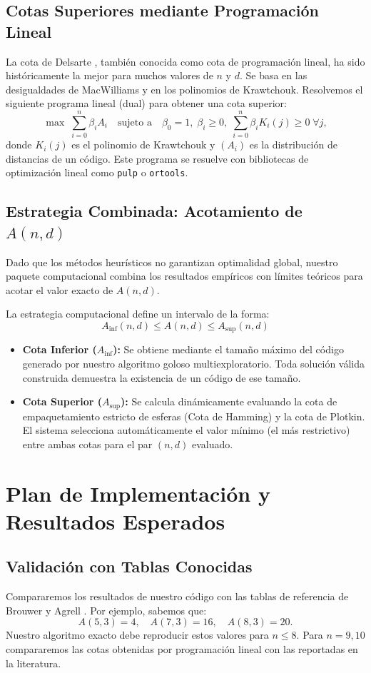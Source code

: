 \documentclass[12pt, spanish]{article}
\begin{document}
\subsection{Cotas Superiores mediante Programación Lineal}
La cota de Delsarte \cite{delsarte1973}, también conocida como cota de programación lineal, ha sido históricamente la mejor para muchos valores de $n$ y $d$. Se basa en las desigualdades de MacWilliams y en los polinomios de Krawtchouk. Resolvemos el siguiente programa lineal (dual) para obtener una cota superior:
\[
\max \; \sum_{i=0}^n \beta_i A_i \quad\text{sujeto a}\quad \beta_0=1,\; \beta_i\ge0,\; \sum_{i=0}^n \beta_i K_i(j) \ge 0\; \forall j,
\]
donde $K_i(j)$ es el polinomio de Krawtchouk y $(A_i)$ es la distribución de distancias de un código. Este programa se resuelve con bibliotecas de optimización lineal como \texttt{pulp} o \texttt{ortools}.

\subsection{Estrategia Combinada: Acotamiento de $A(n,d)$}
Dado que los métodos heurísticos no garantizan optimalidad global, nuestro paquete computacional combina los resultados empíricos con límites teóricos para acotar el valor exacto de $A(n,d)$. 

La estrategia computacional define un intervalo de la forma:
$$A_{\text{inf}}(n,d) \le A(n,d) \le A_{\text{sup}}(n,d)$$

\begin{itemize}
    \item \textbf{Cota Inferior ($A_{\text{inf}}$):} Se obtiene mediante el tamaño máximo del código generado por nuestro algoritmo goloso multiexploratorio. Toda solución válida construida demuestra la existencia de un código de ese tamaño.
    \item \textbf{Cota Superior ($A_{\text{sup}}$):} Se calcula dinámicamente evaluando la cota de empaquetamiento estricto de esferas (Cota de Hamming) y la cota de Plotkin. El sistema selecciona automáticamente el valor mínimo (el más restrictivo) entre ambas cotas para el par $(n,d)$ evaluado.
\end{itemize}

\section{Plan de Implementación y Resultados Esperados}
\label{sec:implementacion}

\subsection{Validación con Tablas Conocidas}
Compararemos los resultados de nuestro código con las tablas de referencia de Brouwer \cite{brouwer2018} y Agrell \cite{agrell2001}. Por ejemplo, sabemos que:
\[
A(5,3)=4,\quad A(7,3)=16,\quad A(8,3)=20.
\]
Nuestro algoritmo exacto debe reproducir estos valores para $n\le 8$. Para $n=9,10$ compararemos las cotas obtenidas por programación lineal con las reportadas en la literatura.

\end{document}
